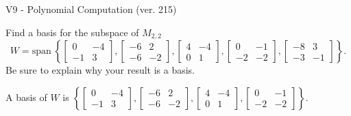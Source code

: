 \begin{exercise}
  \begin{exerciseTitle}V9 - Polynomial Computation (ver. 215)\end{exerciseTitle}
  \begin{exerciseStatement}
    Find a basis for the subspace of \(M_{2,2}\) 
\[W=\mathrm{span}\ \left\{\left[\begin{array}{cc}
0 & -4 \\
-1 & 3
\end{array}\right] , \left[\begin{array}{cc}
-6 & 2 \\
-6 & -2
\end{array}\right] , \left[\begin{array}{cc}
4 & -4 \\
0 & 1
\end{array}\right] , \left[\begin{array}{cc}
0 & -1 \\
-2 & -2
\end{array}\right] , \left[\begin{array}{cc}
-8 & 3 \\
-3 & -1
\end{array}\right]\right\}.\]
 Be sure to explain why your result is a basis.


  \end{exerciseStatement}
  \begin{exerciseAnswer}
   A basis of \(W\) is  \(\left\{\left[\begin{array}{cc}
0 & -4 \\
-1 & 3
\end{array}\right] , \left[\begin{array}{cc}
-6 & 2 \\
-6 & -2
\end{array}\right] , \left[\begin{array}{cc}
4 & -4 \\
0 & 1
\end{array}\right] , \left[\begin{array}{cc}
0 & -1 \\
-2 & -2
\end{array}\right]\right\}\).
  


  \end{exerciseAnswer}
\end{exercise}